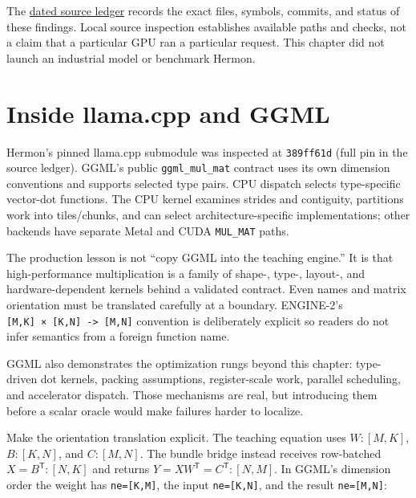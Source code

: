 The
\href{https://github.com/hermonai/inside-the-llm-engine/blob/astra-visual-rewrite/research/astra/chapter06-regeneration.md}{dated
source ledger} records the exact files, symbols, commits, and status of
these findings. Local source inspection establishes available paths and
checks, not a claim that a particular GPU ran a particular request. This
chapter did not launch an industrial model or benchmark Hermon.

\section{Inside llama.cpp and GGML}\label{inside-llama.cpp-and-ggml}

Hermon's pinned llama.cpp submodule was inspected at \texttt{389ff61d}
(full pin in the source ledger). GGML's public \texttt{ggml\_mul\_mat}
contract uses its own dimension conventions and supports selected type
pairs. CPU dispatch selects type-specific vector-dot functions. The CPU
kernel examines strides and contiguity, partitions work into
tiles/chunks, and can select architecture-specific implementations;
other backends have separate Metal and CUDA \texttt{MUL\_MAT} paths.

The production lesson is not ``copy GGML into the teaching engine.'' It
is that high-performance multiplication is a family of shape-, type-,
layout-, and hardware-dependent kernels behind a validated contract.
Even names and matrix orientation must be translated carefully at a
boundary. ENGINE-2's
\texttt{{[}M,K{]}\ ×\ {[}K,N{]}\ -\textgreater{}\ {[}M,N{]}} convention
is deliberately explicit so readers do not infer semantics from a
foreign function name.

GGML also demonstrates the optimization rungs beyond this chapter:
type-driven dot kernels, packing assumptions, register-scale work,
parallel scheduling, and accelerator dispatch. Those mechanisms are
real, but introducing them before a scalar oracle would make failures
harder to localize.


Make the orientation translation explicit. The teaching equation uses
\(W:[M,K]\), \(B:[K,N]\), and \(C:[M,N]\). The bundle bridge instead
receives row-batched \(X=B^{\mathsf T}:[N,K]\) and returns
\(Y=XW^{\mathsf T}=C^{\mathsf T}:[N,M]\). In GGML's dimension order the
weight has \texttt{ne={[}K,M{]}}, the input \texttt{ne={[}K,N{]}}, and
the result \texttt{ne={[}M,N{]}}:

